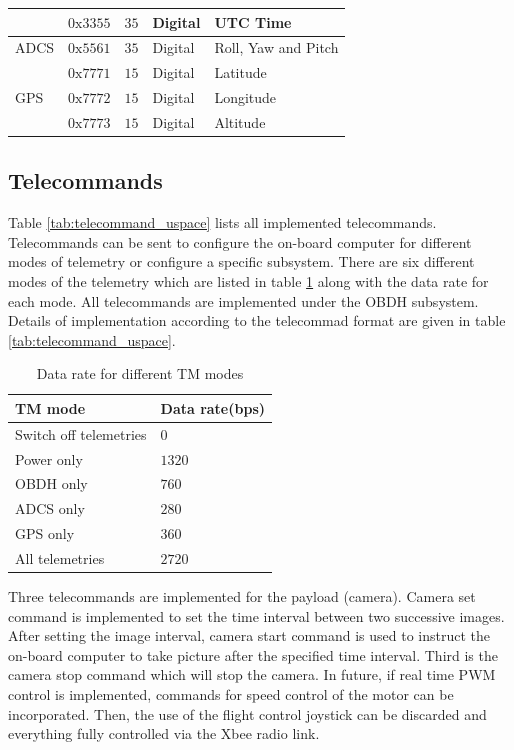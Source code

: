 \begin{table}[bht]
\begin{tabular}{|m{}m{}m{}m{}m{}|}
						&	 $ 0\text{x}3355 $				&	$ 35 $						&	 Digital	 &      UTC Time					      \\
\hline
\multirow{1}{*}{ADCS}   &    $ 0\text{x}5561 $ 				&	$ 35 $						&	 Digital	 &	    Roll, Yaw and Pitch	       		  \\
\hline
\multirow{3}{*}{GPS}    &    $ 0\text{x}7771 $				&	$ 15 $						&	 Digital	 &      Latitude		       	    	  \\
						&    $ 0\text{x}7772 $				&	$ 15 $						&	 Digital	 &      Longitude	   				      \\
						&    $ 0\text{x}7773 $				&	$ 15 $						&    Digital	 &      Altitude  				          \\ 
\hline
\end{tabular}
\end{table}
%

\subsection{Telecommands}
\label{subsec:telecommand}
Table \ref{tab:telecommand_uspace} lists all implemented telecommands. Telecommands can be sent to configure the on-board computer for different modes of telemetry or configure a specific subsystem. There are six different modes of the telemetry which are listed in table \ref{tab:TM_modes} along with the data rate for each mode. All telecommands are implemented under the \ac{OBDH} subsystem. Details of implementation according to the telecommad format are given in table \ref{tab:telecommand_uspace}.
%
\begin{table}[bht]
\centering
\caption[Data rate for different \ac{TM} modes]{Data rate for different \ac{TM} modes}
\label{tab:TM_modes}
\begin{tabular}{|m{}m{}|}
\hline
\textbf{TM mode}			&  		\textbf{Data rate(bps)}   \\
\hline
Switch off telemetries		&		$ 0 $		 			  \\
Power only	   		        &		$ 1320 $		 		  \\
\ac{OBDH} only	      	  	&		$ 760 $		 			  \\
ADCS only			      	&		$ 280 $		 			  \\
GPS only		   		    & 		$ 360 $		 			  \\
All telemetries	      	  	&		$ 2720 $		 		  \\
\hline
\end{tabular}
\end{table}
%
%
Three telecommands are implemented for the payload (camera). Camera set command is implemented to set the time interval between two successive images. After setting the image interval, camera start command is used to instruct the on-board computer to take picture after the specified time interval. Third is the camera stop command which will stop the camera. In future, if real time \ac{PWM} control is implemented, commands for speed control of the motor can be incorporated. Then, the use of the flight control joystick can be discarded and everything fully controlled via the Xbee radio link.

